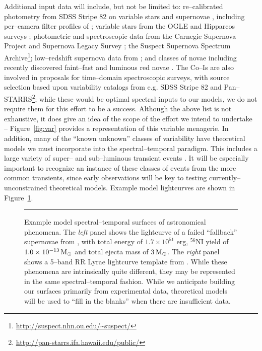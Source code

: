 Additional input data will include, but not be limited to: re--calibrated
photometry from SDSS Stripe 82 on variable stars \citep{2010ApJ...708..717S} and
supernovae \citep{2008AJ....136.2306H,2011ApJ...738..162S}, including
per--camera filter profiles of \cite{2007AJ....134..973I}; variable stars from
the OGLE and Hipparcos surveys \citep{2007A&A...475.1159D}; photometric and
spectroscopic data from the Carnegie Supernova Project
\citep[e.g.][]{2010AJ....139..519C} and Supernova Legacy Survey
\citep[e.g.][]{2011yCat..74101262W}; the Suspect Supernova Spectrum
Archive\footnote{\url{http://suspect.nhn.ou.edu/~suspect/}}; low--redshift
supernova data from \cite{2006AJ....131..527J}; and classes of novae including
recently discovered faint--fast \citep{2011ApJ...735...94K} and luminous red
novae \citep{2011ApJ...730..134K}.  The Co--Is are also involved in proposals
for time--domain spectroscopic surveys, with source selection based upon
variability catalogs from e.g. SDSS Stripe 82 and
Pan--STARRS\footnote{\url{http://pan-starrs.ifa.hawaii.edu/public/}}; while
these would be optimal spectral inputs to our models, we do not require them for
this effort to be a success.  Although the above list is not exhaustive, it does
give an idea of the scope of the effort we intend to undertake --
Figure~\ref{fig:var} provides a representation of this variable menagerie. In
addition, many of the ``known unknown'' classes of variability have theoretical
models we must incorporate into the spectral--temporal paradigm.  This includes
a large variety of super-- and sub--luminous transient events
\citep[e.g.][]{2010ApJ...715..767S,2009ApJ...707..193F}.  It will be especially
important to recognize an instance of these classes of events from the more
common transients, since early observations will be key to testing
currently--unconstrained theoretical models.  Example model lightcurves are
shown in Figure~\ref{fig:sts}.

\begin{figure}[t]
\centerline{ \hfil
{}} \smallskip
\caption[]{\footnotesize Example model spectral--temporal surfaces of
astronomical phenomena.  The {\it left} panel shows the lightcurve of a failed
``fallback'' supernovae from \cite{2009ApJ...707..193F}, with total energy of
$1.7 \times 10^{51}$ erg, $^{56}$NI yield of $1.0 \times 10^{-13} {\rm\,M_\odot}$ and
total ejecta mass of $3 {\rm\,M_\odot}$.  The {\it right} panel shows a 5--band RR Lyrae
lightcurve template from \cite{2010ApJ...708..717S}.  While these phenomena are
intrinsically quite different, they may be represented in the same
spectral--temporal fashion.  While we anticipate building our surfaces primarily
from experimental data, theoretical models will be used to ``fill in the
blanks'' when there are insufficient data.} \medskip \hrule \label{fig:sts}
\end{figure}

